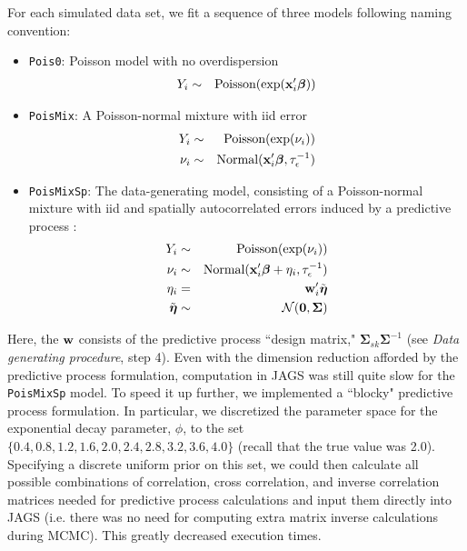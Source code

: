 \documentclass[12pt,fleqn]{article}
\def\bfx{{\bf x}}
\def\bfeta{\boldsymbol{\eta}}
\def\bfbeta{\boldsymbol{\beta}}
\def\bfSigma{\boldsymbol{\Sigma}}
\begin{document}
\begin{flushleft}
For each simulated data set, we fit a sequence of three models following naming convention:
      \begin{itemize}
        \item \texttt{Pois0}: Poisson model with no overdispersion
         \begin{eqnarray*}
           Y_i & \sim & \textrm{Poisson}(\exp(\bfx_i^\prime \bfbeta)) \\
         \end{eqnarray*}
        \item \texttt{PoisMix}: A Poisson-normal mixture with iid error
         \begin{eqnarray*}
           Y_i & \sim & \textrm{Poisson}(\exp(\nu_i)) \\
           \nu_i & \sim & \textrm{Normal}(\bfx_i^\prime \bfbeta, \tau_\epsilon^{-1})\\
          \end{eqnarray*}
        \item \texttt{PoisMixSp}: The data-generating model, consisting of a Poisson-normal mixture with iid and spatially autocorrelated errors induced by a predictive process \citep[cf.][]{BanerjeeEtAl2008}:
          \begin{eqnarray*}
           Y_i & \sim & \textrm{Poisson}(\exp(\nu_i)) \\
           \nu_i & \sim & \textrm{Normal}(\bfx_i^\prime \bfbeta + \eta_i, \tau_\epsilon^{-1}) \\
           \eta_i & = & {\bf w}_i^\prime \tilde{\bfeta} \\
           \tilde{\bfeta} & \sim & \mathcal{N}(\textbf{0},\bfSigma) \\
          \end{eqnarray*}
      \end{itemize}
Here, the ${\bf w}$ consists of the predictive process ``design matrix," $\bfSigma_{sk} \bfSigma^{-1}$ (see \textit{Data generating procedure}, step 4).  Even with the dimension reduction afforded by the predictive process formulation, computation in JAGS was still quite slow for the \texttt{PoisMixSp} model.  To speed it up further, we implemented a ``blocky" predictive process formulation.  In particular, we discretized the parameter space for the exponential decay parameter, $\phi$, to the set $\{0.4, 0.8, 1.2, 1.6, 2.0, 2.4, 2.8, 3.2, 3.6, 4.0\}$ (recall that the true value was 2.0).  Specifying a discrete uniform prior on this set, we could then calculate all possible combinations of correlation, cross correlation, and inverse correlation matrices needed for predictive process calculations and input them directly into JAGS (i.e. there was no need for computing extra matrix inverse calculations during MCMC).  This greatly decreased execution times.


\end{flushleft}
\end{document}

